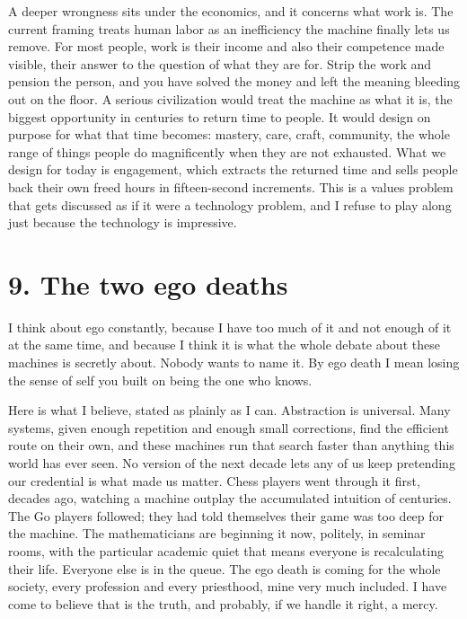 \documentclass[11pt]{article}
\begin{document}
A deeper wrongness sits under the economics, and it concerns what work is. The current framing treats human labor as an inefficiency the machine finally lets us remove. For most people, work is their income and also their competence made visible, their answer to the question of what they are for. Strip the work and pension the person, and you have solved the money and left the meaning bleeding out on the floor. A serious civilization would treat the machine as what it is, the biggest opportunity in centuries to return time to people. It would design on purpose for what that time becomes: mastery, care, craft, community, the whole range of things people do magnificently when they are not exhausted. What we design for today is engagement, which extracts the returned time and sells people back their own freed hours in fifteen-second increments. This is a values problem that gets discussed as if it were a technology problem, and I refuse to play along just because the technology is impressive.

\section*{9. The two ego deaths}

I think about ego constantly, because I have too much of it and not enough of it at the same time, and because I think it is what the whole debate about these machines is secretly about. Nobody wants to name it. By ego death I mean losing the sense of self you built on being the one who knows.

Here is what I believe, stated as plainly as I can. Abstraction is universal. Many systems, given enough repetition and enough small corrections, find the efficient route on their own, and these machines run that search faster than anything this world has ever seen. No version of the next decade lets any of us keep pretending our credential is what made us matter. Chess players went through it first, decades ago, watching a machine outplay the accumulated intuition of centuries. The Go players followed; they had told themselves their game was too deep for the machine. The mathematicians are beginning it now, politely, in seminar rooms, with the particular academic quiet that means everyone is recalculating their life. Everyone else is in the queue. The ego death is coming for the whole society, every profession and every priesthood, mine very much included. I have come to believe that is the truth, and probably, if we handle it right, a mercy.
\end{document}
